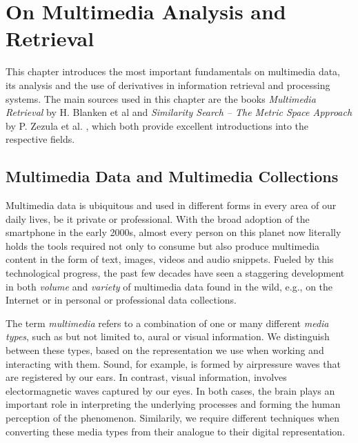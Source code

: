 \chapter{On Multimedia Analysis and Retrieval}
\label{chapter:theory_multimedia_analysis_and_retrieval}

This chapter introduces the most important fundamentals on multimedia data, its analysis and the use of derivatives in information retrieval and processing systems. The main sources used in this chapter are the books \emph{Multimedia Retrieval} by H. Blanken et al \cite{Blanken:2007multimedia} and \emph{Similarity Search -- The Metric Space Approach} by P. Zezula et al. \cite{Zezula:2006Similarity}, which both provide excellent introductions into the respective fields.


\section{Multimedia Data and Multimedia Collections}
\label{section:multmedia_data}

Multimedia data is ubiquitous and used in different forms in every area of our daily lives, be it private or professional. With the broad adoption of the smartphone in the early 2000s, almost every person on this planet now literally holds the tools required not only to consume but also produce multimedia content in the form of text, images, videos and audio snippets. Fueled by this technological progress, the past few decades have seen a staggering development in both \emph{volume} and \emph{variety} of multimedia data found in the wild, e.g., on the Internet or in personal or professional data collections. 

The term \emph{multimedia} refers to a combination of one or many different \emph{media types}, such as but not limited to, aural or visual information. We distinguish between these types, based on the representation we use when working and interacting with them. Sound, for example, is formed by airpressure waves that are registered by our ears. In contrast, visual information, involves electormagnetic waves captured by our eyes. In both cases, the brain plays an important role in interpreting the underlying processes and forming the human perception of the phenomenon. Similarily, we require different techniques when converting these media types from their analogue to their digital representation. 


